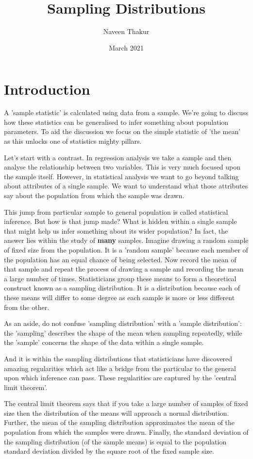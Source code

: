 \documentclass{article}
\title{Sampling Distributions}
\author{Naveen Thakur }
\date{March 2021}
\begin{document}
\maketitle

\section{Introduction}
A 'sample statistic' is calculated using data from a sample. We're going to discuss how these statistics can be generalised to infer something about population parameters. To aid the discussion we focus on the simple statistic of 'the mean' as this unlocks one of statistics mighty pillars.

Let's start with a contrast. In regression analysis we take a sample and then analyse the relationship between two variables. This is very much focused upon the sample itself. However, in statistical analysis we want to go beyond talking about attributes of a single sample. We want to understand what those attributes say about the population from which the sample was drawn.

This jump from particular sample to general population is called statistical inference. But how is that jump made? What is hidden within a single sample that might help us infer something about its wider population? In fact, the answer lies within the study of \textbf{many} samples. Imagine drawing a random sample of fixed size from the population. It is a 'random sample' because each member of the population has an equal chance of being selected. Now record the mean of that sample and repeat the process of drawing a sample and recording the mean a large number of times. Statisticians group these means to form a theoretical construct known as a sampling distribution. It is a distribution because each of these means will differ to some degree as each sample is more or less different from the other.

As an aside, do not confuse 'sampling distribution' with a 'sample distribution': the 'sampling' describes the shape of the mean when sampling repeatedly, while the 'sample' concerns the shape of the data within a single sample.

And it is within the sampling distributions that statisticians have discovered amazing regularities which act like a bridge from the particular to the general upon which inference can pass. These regularities are captured by the 'central limit theorem'.

The central limit theorem says that if you take a large number of samples of fixed size then the distribution of the means will approach a normal distribution. Further, the mean of the sampling distribution approximates the mean of the population from which the samples were drawn. Finally, the standard deviation of the sampling distribution (of the sample means) is equal to the population standard deviation divided by the square root of the fixed sample size.
\end{document}
